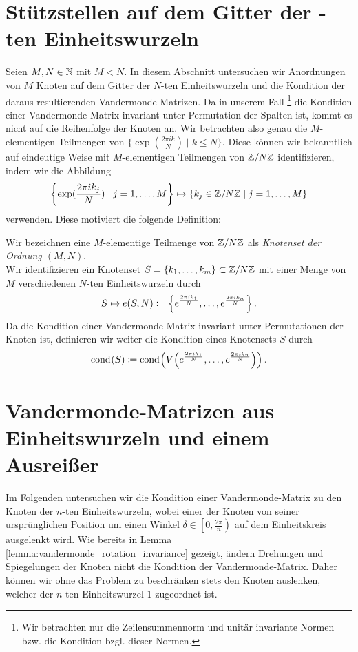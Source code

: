 \section{Stützstellen auf dem Gitter der -ten Einheitswurzeln}
Seien $M, N \in \mathbb{N}$ mit $M < N$.
In diesem Abschnitt untersuchen wir Anordnungen von $M$ Knoten auf dem Gitter
der $N$-ten Einheitswurzeln und die Kondition der daraus resultierenden
Vandermonde-Matrizen.
Da in unserem Fall
\footnote{Wir betrachten nur die Zeilensummennorm und unitär invariante Normen bzw. die Kondition bzgl. dieser Normen.}
die Kondition einer Vandermonde-Matrix invariant unter
Permutation der Spalten ist, kommt es nicht auf die Reihenfolge der Knoten an.
Wir betrachten also genau die $M$-elementigen Teilmengen von
$\{ \exp( \frac{2 \pi i k}{N} ) \; | \; k \leq N \}$.
Diese können wir bekanntlich auf eindeutige Weise mit $M$-elementigen
Teilmengen von $ \mathbb{Z} / N\mathbb{Z}$ identifizieren, indem wir die Abbildung
\[
    \left\{ \exp( \frac{2 \pi i k_j}{N} ) \; | \; j = 1,\dots, M \right\} \mapsto \left\{ k_j \in \mathbb{Z}/N\mathbb{Z} \; | \; j = 1, \dots, M \right\}
\]
verwenden.
Diese motiviert die folgende Definition:

\begin{mydef}[Knotenset]
    Wir bezeichnen eine $M$-elementige Teilmenge von $\mathbb{Z}/N\mathbb{Z}$
    als \emph{Knotenset der Ordnung $(M,N)$}.\\
    Wir identifizieren ein Knotenset
    $S = \{k_1, \dots, k_m\} \subset \mathbb{Z}/N\mathbb{Z}$
    mit einer Menge von $M$ verschiedenen $N$-ten Einheitswurzeln durch
    \[
        S \mapsto e(S, N) \coloneqq \left\{ e^{\frac{2 \pi i k_1}{N}}, \dots, e^{\frac{2 \pi i k_n}{N}} \right\}.
    \]
    Da die Kondition einer Vandermonde-Matrix invariant unter Permutationen der
    Knoten ist, definieren wir weiter die Kondition eines Knotensets $S$ durch
    \[
        \text{cond}_{{}}\! \left( S \right) \coloneqq \text{cond}_{{}}\! \left( V \! \left(  e^{\frac{2 \pi i k_1}{N}}, \dots, e^{\frac{2 \pi i k_n}{N}}  \right) \right).
    \]
\end{mydef}

\section{Vandermonde-Matrizen aus  Einheitswurzeln und einem Ausreißer}

Im Folgenden untersuchen wir die Kondition einer Vandermonde-Matrix zu den
Knoten der $n$-ten Einheitswurzeln, wobei einer der Knoten von seiner
ursprünglichen Position um einen Winkel $\delta \in \left[0,\frac{2
\pi}{n}\right)$ auf dem Einheitskreis ausgelenkt wird.
Wie bereits in Lemma \ref{lemma:vandermonde_rotation_invariance} gezeigt,
ändern Drehungen und Spiegelungen der Knoten nicht die Kondition der
Vandermonde-Matrix.
Daher können wir ohne das Problem zu beschränken stets den Knoten auslenken,
welcher der $n$-ten Einheitswurzel $1$ zugeordnet ist.

